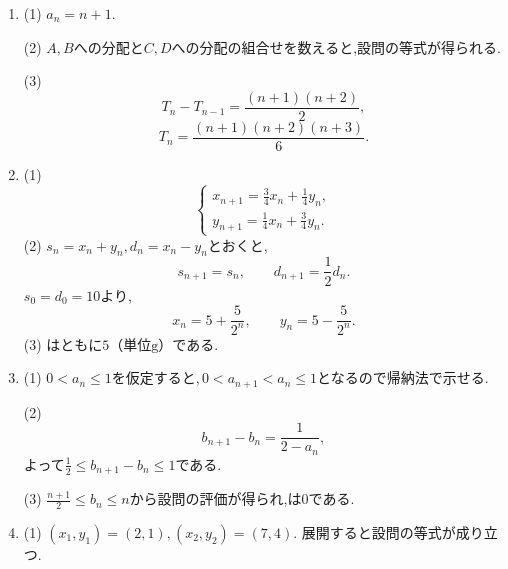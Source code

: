 \begin{enumerate}[label=\textbf{問\arabic*.},leftmargin=3.8em,format=\bookitemlink{practice-bridge}{answer}{problem}]
                (2)
                \[
                  S_n=\frac{S_0}{4^n}.
                \]
                (3)
                \[
                  \overrightarrow{OA_n}
                    =\left(-\frac12\right)^n\overrightarrow{OA_0}.
                \]
                $\displaystyle B_n,C_n$にも同様の式が成り立ち,すべて$\displaystyle O$へ近づく.
          \item (1) $\displaystyle a_n=n+1$.
                \par\smallskip\noindent
                (2) $\displaystyle A,B$への分配と$\displaystyle C,D$への分配の組合せを数えると,設問の等式が得られる.
                \par\smallskip\noindent
                (3)
                \[
                  T_n-T_{n-1}=\frac{(n+1)(n+2)}2,
                \]
                \[
                  T_n=\frac{(n+1)(n+2)(n+3)}6.
                \]
          \item (1)
                \[
                  \begin{cases}
                    x_{n+1}=\frac34x_n+\frac14y_n,\\[3pt]
                    y_{n+1}=\frac14x_n+\frac34y_n.
                  \end{cases}
                \]
                (2) $\displaystyle s_n=x_n+y_n,d_n=x_n-y_n$とおくと,
                \[
                  s_{n+1}=s_n,\qquad d_{n+1}=\frac12d_n.
                \]
                $\displaystyle s_0=d_0=10$より,
                \[
                  x_n=5+\frac5{2^n},\qquad
                  y_n=5-\frac5{2^n}.
                \]
                (3) はともに$\displaystyle 5$（単位$\displaystyle \mathrm{g}$）である.
          \item (1) $\displaystyle 0<a_n\le1$を仮定すると,\,$\displaystyle 0<a_{n+1}<a_n\le1$となるので帰納法で示せる.
                \par\smallskip\noindent
                (2)
                \[
                  b_{n+1}-b_n=\frac1{2-a_n},
                \]
                よって$\displaystyle \frac12\le b_{n+1}-b_n\le1$である.
                \par\smallskip\noindent
                (3) $\displaystyle \frac{n+1}{2}\le b_n\le n$から設問の評価が得られ,は$\displaystyle 0$である.
          \item (1) $\displaystyle (x_1,y_1)=(2,1),(x_2,y_2)=(7,4)$.
                展開すると設問の等式が成り立つ.
                \par\smallskip\noindent

\end{enumerate}
